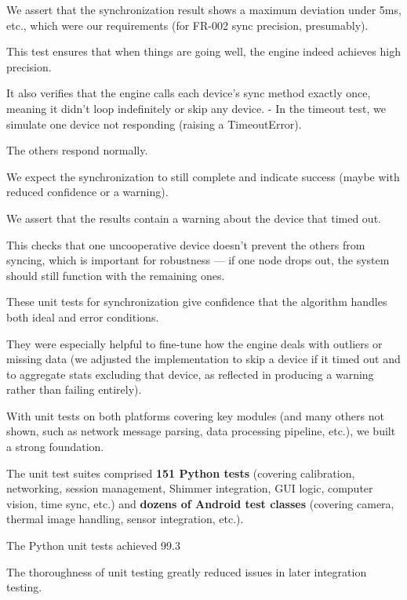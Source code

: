 {{{We assert that the synchronization result shows a maximum deviation under 5ms, etc., which were our requirements (for FR-002 sync precision, presumably).

This test ensures that when things are going well, the engine indeed achieves high precision.

It also verifies that the engine calls each device's sync method exactly once, meaning it didn't loop indefinitely or skip any device. - In the timeout test, we simulate one device not responding (raising a TimeoutError).

The others respond normally.

We expect the synchronization to still complete and indicate success (maybe with reduced confidence or a warning).

We assert that the results contain a warning about the device that timed out.

This checks that one uncooperative device doesn't prevent the others from syncing, which is important for robustness --- if one node drops out, the system should still function with the remaining ones.

These unit tests for synchronization give confidence that the algorithm handles both ideal and error conditions.

They were especially helpful to fine-tune how the engine deals with outliers or missing data (we adjusted the implementation to skip a device if it timed out and to aggregate stats excluding that device, as reflected in producing a warning rather than failing entirely).

With unit tests on both platforms covering key modules (and many others not shown, such as network message parsing, data processing pipeline, etc.), we built a strong foundation.

The unit test suites comprised \textbf{151 Python tests}
 (covering calibration, networking, session management, Shimmer integration, GUI logic, computer vision, time sync, etc.) and \textbf{dozens of Android test classes}
 (covering camera, thermal image handling, sensor integration, etc.).

The Python unit tests achieved 99.3%

The thoroughness of unit testing greatly reduced issues in later integration testing.

}}}
